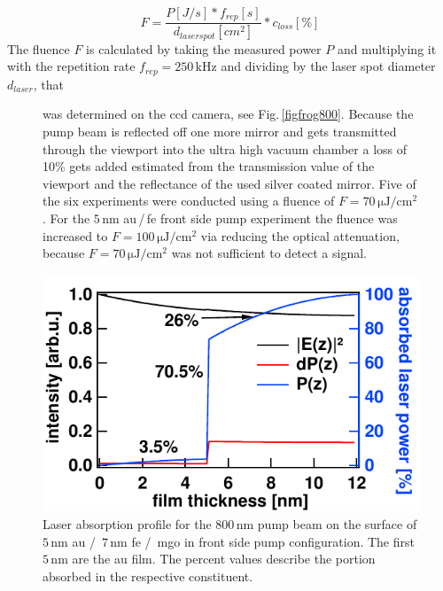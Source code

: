 \documentclass[a4paper,12pt,twoside]{article}
\begin{document}
\begin{equation}
    \label{powermeter}
    F = \frac{ P\left[ J/s \right] *f_{rep}[s] }{ d_{laserspot} \left[cm^{2} \right] }*c_{loss}\left[\%\right] 
\end{equation}
The fluence $F$ is calculated by taking the measured power $P$ and multiplying it with the repetition rate $f_{rep} = 250\,\mathrm{kHz}$ and dividing by the laser spot diameter $d_{laser}$, that
	\begin{figure}[H]
		\begin{minipage}{.45\linewidth}
		     was determined on the \gls{ccd} camera, see Fig.\,\ref{figfrog800}. Because the pump beam is reflected off one more mirror and gets transmitted through the viewport into the ultra high vacuum chamber a loss of 10\% gets added estimated from the transmission value of the viewport and the reflectance of the used silver coated mirror. Five of the six experiments were conducted using a fluence of $F = 70\,\mathrm{\mu J/cm^{2}}$. For the $5\,\mathrm{\mbox{nm}}$ \gls{au}\,/\,\gls{fe} front side pump experiment the fluence was increased to $F = 100\,\mathrm{\mu J/cm^{2}}$ via reducing the optical attenuation, because $F = 70\,\mathrm{\mu J/cm^{2}}$ was not sufficient to detect a signal.
		\end{minipage}
			\hspace{.075\linewidth}
		\begin{minipage}{.45\linewidth}
			\includegraphics[width=\linewidth]{figures/laserremind.pdf}
			\caption{Laser absorption profile for the $800\,\mathrm{nm}$ pump beam on the surface of $5\,\mathrm{\mbox{nm}}$ \gls{au} /\, $7\,\mathrm{\mbox{nm}}$ \gls{fe} /\, \gls{mgo} in front side pump configuration. The first $5\,\mathrm{nm}$ are the \gls{au} film. The percent values describe the portion absorbed in the respective constituent.}
			    \label{laserremind}
		\end{minipage}
	\end{figure}
\end{document}
